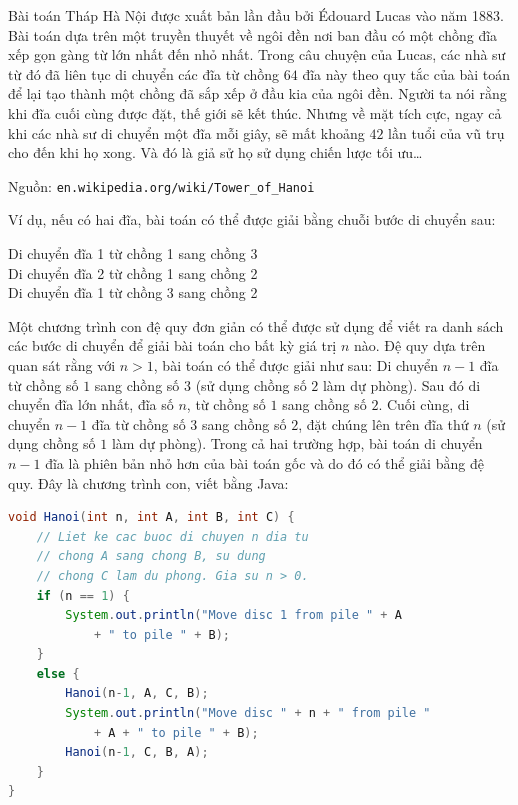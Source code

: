 \begin{infobox}
Bài toán Tháp Hà Nội được xuất bản lần đầu bởi Édouard Lucas vào năm 1883. Bài toán dựa trên một truyền thuyết về ngôi đền nơi ban đầu có một chồng đĩa xếp gọn gàng từ lớn nhất đến nhỏ nhất. Trong câu chuyện của Lucas, các nhà sư từ đó đã liên tục di chuyển các đĩa từ chồng $64$ đĩa này theo quy tắc của bài toán để lại tạo thành một chồng đã sắp xếp ở đầu kia của ngôi đền. Người ta nói rằng khi đĩa cuối cùng được đặt, thế giới sẽ kết thúc. Nhưng về mặt tích cực, ngay cả khi các nhà sư di chuyển một đĩa mỗi giây, sẽ mất khoảng $42$ lần tuổi của vũ trụ cho đến khi họ xong. Và đó là giả sử họ sử dụng chiến lược tối ưu\ldots

Nguồn: \texttt{en.wikipedia.org/wiki/Tower\_of\_Hanoi}
\end{infobox}

Ví dụ, nếu có hai đĩa, bài toán có thể được giải bằng chuỗi bước di chuyển sau:
\begin{center}
Di chuyển đĩa 1 từ chồng 1 sang chồng 3\\
Di chuyển đĩa 2 từ chồng 1 sang chồng 2\\
Di chuyển đĩa 1 từ chồng 3 sang chồng 2
\end{center}

Một chương trình con đệ quy đơn giản có thể được sử dụng để viết ra danh sách các bước di chuyển để giải bài toán cho bất kỳ giá trị $n$ nào. Đệ quy dựa trên quan sát rằng với $n > 1$, bài toán có thể được giải như sau: Di chuyển $n - 1$ đĩa từ chồng số $1$ sang chồng số $3$ (sử dụng chồng số $2$ làm dự phòng). Sau đó di chuyển đĩa lớn nhất, đĩa số $n$, từ chồng số $1$ sang chồng số $2$. Cuối cùng, di chuyển $n - 1$ đĩa từ chồng số $3$ sang chồng số $2$, đặt chúng lên trên đĩa thứ $n$ (sử dụng chồng số $1$ làm dự phòng). Trong cả hai trường hợp, bài toán di chuyển $n - 1$ đĩa là phiên bản nhỏ hơn của bài toán gốc và do đó có thể giải bằng đệ quy. Đây là chương trình con, viết bằng Java:

\begin{lstlisting}[language=Java]
void Hanoi(int n, int A, int B, int C) {
    // Liet ke cac buoc di chuyen n dia tu
    // chong A sang chong B, su dung
    // chong C lam du phong. Gia su n > 0.
    if (n == 1) {
        System.out.println("Move disc 1 from pile " + A
            + " to pile " + B);
    }
    else {
        Hanoi(n-1, A, C, B);
        System.out.println("Move disc " + n + " from pile "
            + A + " to pile " + B);
        Hanoi(n-1, C, B, A);
    }
}
\end{lstlisting}

